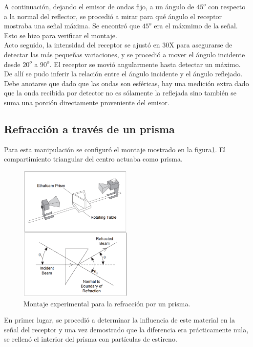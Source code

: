 \documentclass[prb,aps,twocolumn,preprintnumbers,amsmath,amssymb]{revtex4}
\begin{document}
A continuación, dejando el emisor de ondas fijo, a un ángulo de $45^o$ con respecto a la normal del reflector, se procedió a mirar para qué ángulo el receptor mostraba una señal máxima. Se encontró que $45^o$ era el máxmimo de la señal. Esto se hizo para verificar el montaje. \\

Acto seguido, la intensidad del receptor se ajustó en 30X para asegurarse de detectar las más pequeñas variaciones, y se procedió a mover el ángulo incidente desde $20^o$ a $90^o$. El receptor se movió angularmente hasta detectar un máximo. De allí se pudo inferir la relación entre el ángulo incidente y el ángulo reflejado.  \\

Debe anotarse que dado que las ondas son esféricas, hay una medición extra dado que la onda recibida por detector no es sólamente la reflejada sino también se suma una porción directamente proveniente del emisor.

\subsection{Refracción a través de un prisma}

Para esta manipulación se configuró el montaje mostrado en la figura\footnotemark[6] \ref{fig:refraccion}. El compartimiento triangular del centro actuaba como prisma. 

\begin{figure}[h!]
\centering
\includegraphics[width=0.5\textwidth]{refraction}
\caption{Montaje experimental para la refracción por un prisma.}
\label{fig:refraccion}
\end{figure}
 
En primer lugar, se procedió a determinar la influencia de este material en la señal del receptor y una vez demostrado que la diferencia era prácticamente nula, se rellenó el interior del prisma con partículas de estireno.\\ 
\end{document}
